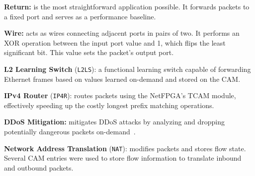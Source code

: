 \textbf{Return:} is the most straightforward application possible. It forwards packets to a fixed port and serves as a performance baseline. 

\textbf{Wire:} acts as wires connecting adjacent ports in pairs of two. It performs an XOR operation between the input port value and 1, which flips the least significant bit. This value sets the packet's output port.

\textbf{L2 Learning Switch} (\texttt{L2LS}): a functional learning switch capable of forwarding Ethernet frames based on values learned on-demand and stored on the CAM.


\textbf{IPv4 Router} (\texttt{IP4R}): routes packets using the NetFPGA's TCAM module, effectively speeding up the costly longest prefix matching operations. 

\textbf{DDoS Mitigation:} mitigates DDoS attacks by analyzing and dropping potentially dangerous packets on-demand~\cite{Bertin2017}.

\textbf{Network Address Translation} (\texttt{NAT}): modifies packets and stores flow state. Several CAM entries were used to store flow information to translate inbound and outbound packets.


